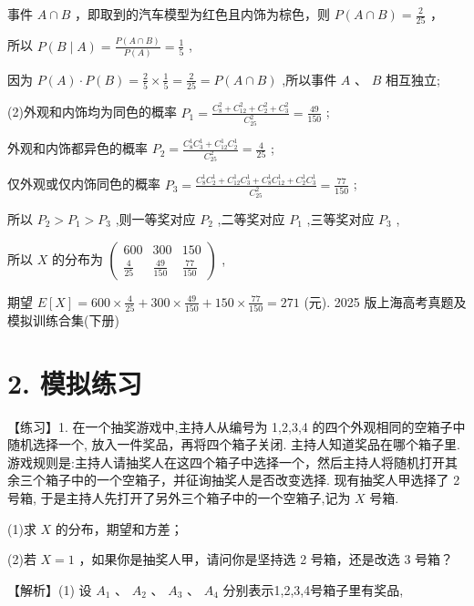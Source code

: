 \documentclass[10pt]{article}
\begin{document}
事件 \(A \cap  B\) ，即取到的汽车模型为红色且内饰为棕色，则 \(P\left( {A \cap  B}\right)  = \frac{2}{25}\) ，

所以 \(P\left( {B \mid  A}\right)  = \frac{P\left( {A \cap  B}\right) }{P\left( A\right) } = \frac{1}{5}\) ,

因为 \(P\left( A\right)  \cdot  P\left( B\right)  = \frac{2}{5} \times  \frac{1}{5} = \frac{2}{25} = P\left( {A \cap  B}\right)\) ,所以事件 \(A\text{ 、 }B\) 相互独立;

(2)外观和内饰均为同色的概率 \({P}_{1} = \frac{{C}_{8}^{2} + {C}_{12}^{2} + {C}_{2}^{2} + {C}_{3}^{2}}{{C}_{25}^{2}} = \frac{49}{150}\) ;

外观和内饰都异色的概率 \({P}_{2} = \frac{{C}_{8}^{1}{C}_{3}^{1} + {C}_{12}^{1}{C}_{2}^{1}}{{C}_{25}^{2}} = \frac{4}{25}\) ;

仅外观或仅内饰同色的概率 \({P}_{3} = \frac{{C}_{8}^{1}{C}_{2}^{1} + {C}_{12}^{1}{C}_{3}^{1} + {C}_{8}^{1}{C}_{12}^{1} + {C}_{2}^{1}{C}_{3}^{1}}{{C}_{25}^{2}} = \frac{77}{150}\) ;

所以 \({P}_{2} > {P}_{1} > {P}_{3}\) ,则一等奖对应 \({P}_{2}\) ,二等奖对应 \({P}_{1}\) ,三等奖对应 \({P}_{3}\) ,

所以 \(X\) 的分布为 \(\left( \begin{matrix} {600} & {300} & {150} \\  \frac{4}{25} & \frac{49}{150} & \frac{77}{150} \end{matrix}\right)\) ,

期望 \(E\left\lbrack  X\right\rbrack   = {600} \times  \frac{4}{25} + {300} \times  \frac{49}{150} + {150} \times  \frac{77}{150} = {271}\) (元). 2025 版上海高考真题及模拟训练合集(下册)

\section*{2. 模拟练习}

【练习】1. 在一个抽奖游戏中,主持人从编号为 1,2,3,4 的四个外观相同的空箱子中随机选择一个, 放入一件奖品，再将四个箱子关闭. 主持人知道奖品在哪个箱子里. 游戏规则是:主持人请抽奖人在这四个箱子中选择一个，然后主持人将随机打开其余三个箱子中的一个空箱子，并征询抽奖人是否改变选择. 现有抽奖人甲选择了 2 号箱, 于是主持人先打开了另外三个箱子中的一个空箱子,记为 \(X\) 号箱.

(1)求 \(X\) 的分布，期望和方差；

(2)若 \(X = 1\) ，如果你是抽奖人甲，请问你是坚持选 2 号箱，还是改选 3 号箱？

【解析】(1) 设 \({A}_{1}\text{ 、 }{A}_{2}\text{ 、 }{A}_{3}\text{ 、 }{A}_{4}\) 分别表示1,2,3,4号箱子里有奖品,
\end{document}
